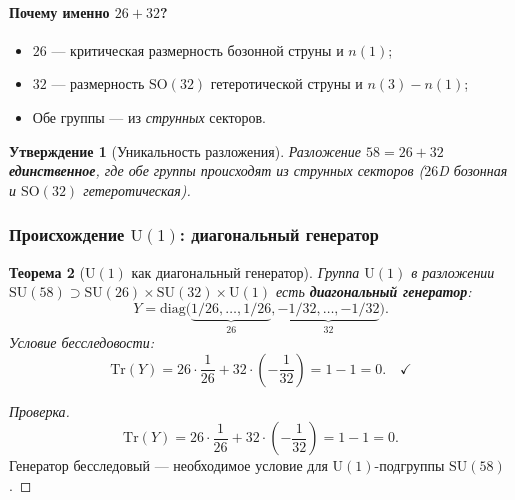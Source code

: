 \documentclass[11pt,a4paper]{article}
\newcommand{\SU}{\mathrm{SU}}
\newcommand{\SO}{\mathrm{SO}}
\newtheorem{theorem}{Теорема}[section]
\newtheorem{proposition}[theorem]{Утверждение}
\theoremstyle{definition}
\begin{document}
\paragraph{Почему именно $26 + 32$?}
\begin{itemize}
    \item $26$ — критическая размерность бозонной струны 
          и $n(1)$;
    \item $32$ — размерность $\SO(32)$ гетеротической струны 
          и $n(3) - n(1)$;
    \item Обе группы — из \emph{струнных} секторов.
\end{itemize}

\begin{proposition}[Уникальность разложения]
\label{prop:unique-decomposition}
Разложение $58 = 26 + 32$ \textbf{единственное}, где обе группы 
происходят из струнных секторов ($26$D бозонная и $\SO(32)$ 
гетеротическая).
\end{proposition}

\subsubsection{Происхождение \texorpdfstring{$\mathrm{U}(1)$}{U(1)}: диагональный генератор}
\label{subsubsec:u1-diagonal}

\begin{theorem}[$\mathrm{U}(1)$ как диагональный генератор]
\label{thm:u1-diagonal}
Группа $\mathrm{U}(1)$ в разложении
$\SU(58) \supset \SU(26) \times \SU(32) \times \mathrm{U}(1)$
есть \textbf{диагональный генератор}:
\begin{equation}
    \boxed{
    Y = \mathrm{diag}\bigl(
    \underbrace{1/26, \ldots, 1/26}_{26},
    \underbrace{-1/32, \ldots, -1/32}_{32}
    \bigr).
    }
    \label{eq:u1-diag}
\end{equation}
Условие бесследовости:
\begin{equation}
    \mathrm{Tr}(Y) = 26 \cdot \frac{1}{26} + 32 \cdot \left(-\frac{1}{32}\right)
    = 1 - 1 = 0. \quad \checkmark
\end{equation}
\end{theorem}

\begin{proof}[Проверка]
\begin{equation}
    \mathrm{Tr}(Y) = 26 \cdot \frac{1}{26} + 32 \cdot \left(-\frac{1}{32}\right)
    = 1 - 1 = 0.
\end{equation}
Генератор бесследовый — необходимое условие для
$\mathrm{U}(1)$-подгруппы $\SU(58)$.
\end{proof}
\end{document}
